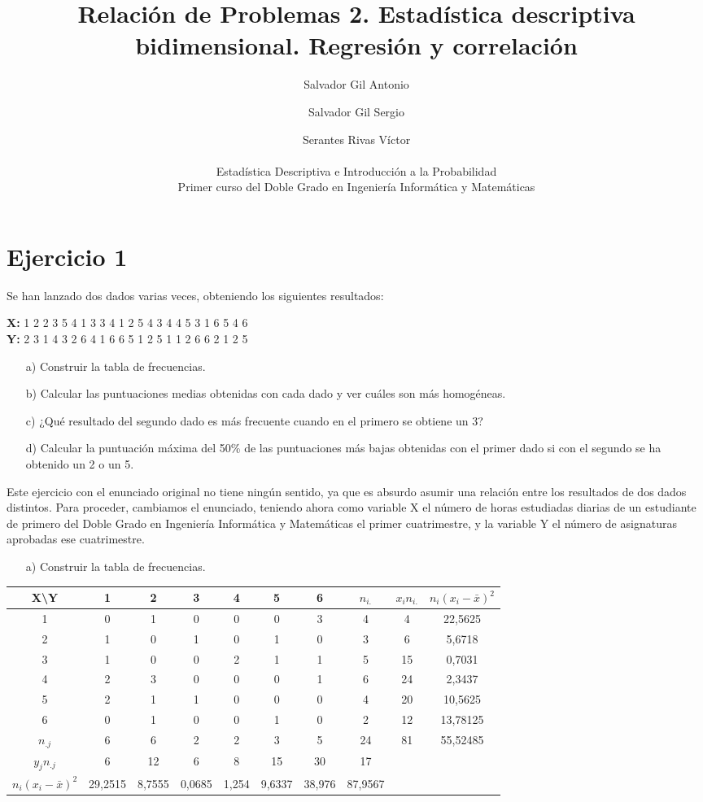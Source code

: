 \documentclass[a4paper,12pt]{article}
\title{Relación de Problemas 2. Estadística descriptiva bidimensional. Regresión y correlación}
\author{Salvador Gil Antonio \and Salvador Gil Sergio \and Serantes Rivas Víctor\\\\Estadística Descriptiva e Introducción a la Probabilidad \\ Primer curso del Doble Grado en Ingeniería Informática y Matemáticas}
\begin{document}
\maketitle
\section*{Ejercicio 1}
Se han lanzado dos dados varias veces, obteniendo los siguientes resultados:

\noindent
\textbf{X:} 1 2 2 3 5 4 1 3 3 4 1 2 5 4 3 4 4 5 3 1 6 5 4 6 \\
\textbf{Y:} 2 3 1 4 3 2 6 4 1 6 6 5 1 2 5 1 1 2 6 6 2 1 2 5

\begin{enumerate}
    \item[a)] Construir la tabla de frecuencias.
    \item[b)] Calcular las puntuaciones medias obtenidas con cada dado y ver cuáles son más homogéneas.
    \item[c)] ¿Qué resultado del segundo dado es más frecuente cuando en el primero se obtiene un 3?
    \item[d)] Calcular la puntuación máxima del 50\% de las puntuaciones más bajas obtenidas con el primer dado si con el segundo se ha obtenido un 2 o un 5.
\end{enumerate}

Este ejercicio con el enunciado original no tiene ningún sentido, ya que es absurdo asumir una relación entre los resultados de dos dados distintos. Para proceder, cambiamos el enunciado, teniendo ahora como variable X el número de horas estudiadas diarias de un estudiante de primero del Doble Grado en Ingeniería Informática y Matemáticas el primer cuatrimestre, y la variable Y el número de asignaturas aprobadas ese cuatrimestre.

\begin{enumerate}
    \item[a)] Construir la tabla de frecuencias.
\end{enumerate}

\begin{center}
\begin{tabular}{c|cccccc|c||c|c}
\textbf{X\textbackslash Y} & 1 & 2 & 3 & 4 & 5 & 6 & $n_{i.}$ & $x_in_{i.}$& $n_i(x_i- \bar x)^2$\\
\hline
1 & 0 & 1 & 0 & 0 & 0 & 3  & 4 & 4&22,5625\\
2 & 1 & 0 & 1 & 0 & 1 & 0  & 3 & 6 &5,6718\\
3 & 1 & 0 & 0 & 2 & 1 & 1  & 5 & 15 & 0,7031\\
4 & 2 & 3 & 0 & 0 & 0 & 1  & 6 & 24 & 2,3437\\
5 & 2 & 1 & 1 & 0 & 0 & 0  & 4 & 20 & 10,5625\\
6 & 0 & 1 & 0 & 0 & 1 & 0  & 2 & 12 & 13,78125\\
\hline
$n_{.j}$ & 6 & 6 & 2 & 2 & 3 & 5 & 24 & 81 &55,52485\\
\hline
$y_jn_{.j}$ & 6 & 12 & 6 & 8 & 15 & 30 & 17&\\
\hline
$n_i(x_i- \bar x)^2$ & 29,2515&8,7555 &0,0685&1,254&9,6337&38,976&87,9567&\\
\end{tabular}
\end{center}
\end{document}
